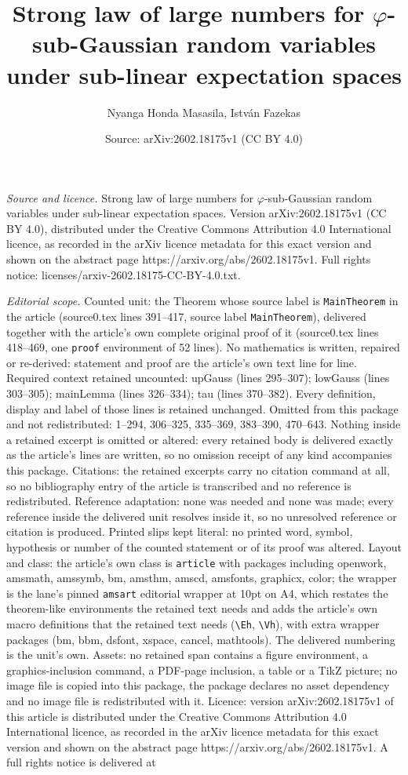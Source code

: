 \documentclass[10pt,a4paper]{amsart}
\title[Strong law of large numbers for $\varphi$-sub-Gaussian rando]{Strong law of large numbers for $\varphi$-sub-Gaussian random variables under sub-linear expectation spaces}
\author{Nyanga Honda Masasila, Istv\'an Fazekas}
\date{Source: arXiv:2602.18175v1 (CC BY 4.0)}
\begin{document}
\maketitle

\noindent\emph{Source and licence.} Strong law of large numbers for $\varphi$-sub-Gaussian random variables under sub-linear expectation spaces. Version arXiv:2602.18175v1 (CC BY 4.0), distributed under the Creative Commons Attribution 4.0 International licence, as recorded in the arXiv licence metadata for this exact version and shown on the abstract page https://arxiv.org/abs/2602.18175v1. Full rights notice: licenses/arxiv-2602.18175-CC-BY-4.0.txt.\par\smallskip

\noindent\textit{Editorial scope.} Counted unit: the Theorem whose source label is \texttt{MainTheorem} in the article (source0.tex lines 391--417, source label \texttt{MainTheorem}), delivered together with the article's own complete original proof of it (source0.tex lines 418--469, one \texttt{proof} environment of 52 lines). No mathematics is written, repaired or re-derived: statement and proof are the article's own text line for line. Required context retained uncounted: upGauss (lines 295--307); lowGauss (lines 303--305); mainLemma (lines 326--334); tau (lines 370--382). Every definition, display and label of those lines is retained unchanged. Omitted from this package and not redistributed: 1--294, 306--325, 335--369, 383--390, 470--643. Nothing inside a retained excerpt is omitted or altered: every retained body is delivered exactly as the article's lines are written, so no omission receipt of any kind accompanies this package. Citations: the retained excerpts carry no citation command at all, so no bibliography entry of the article is transcribed and no reference is redistributed. Reference adaptation: none was needed and none was made; every reference inside the delivered unit resolves inside it, so no unresolved reference or citation is produced. Printed slips kept literal: no printed word, symbol, hypothesis or number of the counted statement or of its proof was altered. Layout and class: the article's own class is \texttt{article} with packages including openwork, amsmath, amssymb, bm, amsthm, amscd, amsfonts, graphicx, color; the wrapper is the lane's pinned \texttt{amsart} editorial wrapper at 10pt on A4, which restates the theorem-like environments the retained text needs and adds the article's own macro definitions that the retained text needs (\texttt{\textbackslash Eh}, \texttt{\textbackslash Vh}), with extra wrapper packages (bm, bbm, dsfont, xspace, cancel, mathtools). The delivered numbering is the unit's own. Assets: no retained span contains a figure environment, a graphics-inclusion command, a PDF-page inclusion, a table or a TikZ picture; no image file is copied into this package, the package declares no asset dependency and no image file is redistributed with it. Licence: version arXiv:2602.18175v1 of this article is distributed under the Creative Commons Attribution 4.0 International licence, as recorded in the arXiv licence metadata for this exact version and shown on the abstract page https://arxiv.org/abs/2602.18175v1. A full rights notice is delivered at 
\end{document}
